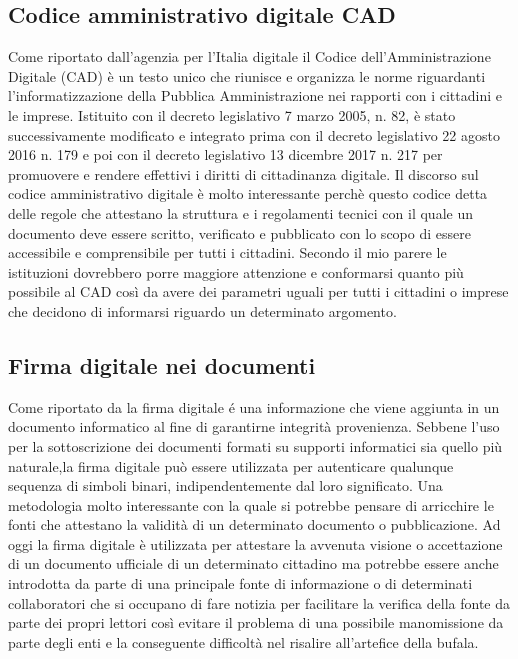 \documentclass{article}
\begin{document}
\subsection{Codice amministrativo digitale CAD}
Come riportato dall'agenzia per l'Italia digitale \cite{giacalone2007normativa}
il Codice dell'Amministrazione Digitale (CAD) è un testo unico che riunisce e organizza le norme riguardanti l'informatizzazione della Pubblica Amministrazione nei rapporti con i cittadini e le imprese. Istituito con il decreto legislativo 7 marzo 2005, n. 82, è stato successivamente modificato e integrato prima con il decreto legislativo 22 agosto 2016 n. 179 e poi con il decreto legislativo 13 dicembre 2017 n. 217 per promuovere e rendere effettivi i diritti di cittadinanza digitale.
Il discorso sul codice amministrativo digitale è molto interessante perchè questo codice detta delle regole che attestano la struttura e i regolamenti tecnici con il quale un documento deve essere scritto, verificato e pubblicato con lo scopo di essere accessibile e comprensibile per tutti i cittadini.
Secondo il mio parere le istituzioni dovrebbero porre maggiore attenzione e conformarsi quanto più possibile al CAD così da avere dei parametri uguali per tutti i cittadini o imprese che decidono di informarsi riguardo un determinato argomento.

\subsection{Firma digitale nei documenti}
Come riportato da \cite{terranova1998firma} la firma digitale é una informazione che viene aggiunta in un documento informatico al fine di garantirne integrità provenienza. Sebbene l'uso per la sottoscrizione dei documenti formati su supporti informatici sia quello più naturale,la firma digitale può essere utilizzata per autenticare qualunque sequenza di simboli binari, indipendentemente dal loro significato.
Una metodologia molto interessante con la quale si potrebbe pensare di arricchire le fonti che attestano la validità di un determinato documento o pubblicazione.
Ad oggi la firma digitale è utilizzata per attestare la avvenuta visione o accettazione di un documento ufficiale di un determinato cittadino ma potrebbe essere anche introdotta da parte di una principale fonte di informazione o di determinati collaboratori che si occupano di fare notizia per facilitare la verifica della fonte da parte dei propri lettori così evitare il problema di una possibile manomissione da parte degli enti e la conseguente difficoltà nel risalire all'artefice della bufala.
\end{document}
